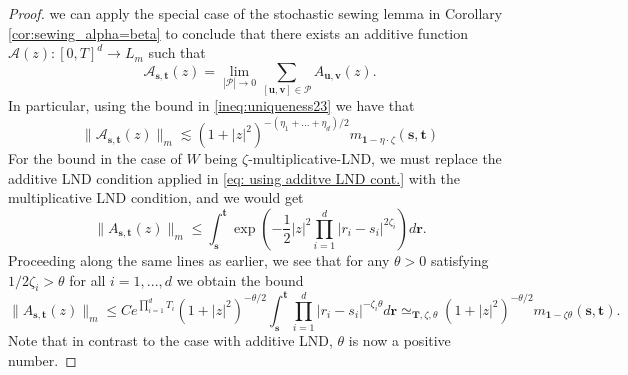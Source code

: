 \documentclass[11pt,oneside,english,reqno]{amsart}
\numberwithin{equation}{section}
\numberwithin{figure}{section}
\theoremstyle{plain}
\theoremstyle{definition}
\theoremstyle{remark}
\theoremstyle{plain}
\theoremstyle{plain}
\theoremstyle{plain}
\theoremstyle{plain}
\theoremstyle{plain}
\newcommand{\cA}{\mathcal{A}}
\newcommand{\cP}{\mathcal{P}}
\newcommand{\br}{\mathbf{r}}
\newcommand{\bu}{\mathbf{u}}
\newcommand{\bv}{\mathbf{v}}
\newcommand{\bs}{\mathbf{s}}
\newcommand{\bt}{\mathbf{t}}
\begin{document}
\begin{proof}
we can apply the special case of the stochastic sewing lemma in Corollary \ref{cor:sewing_alpha=beta} to conclude that there exists an additive function $\cA (z):[0,T]^d\rightarrow L_m$ such that 
\[
\cA_{\bs,\bt}(z)=\lim_{|\cP|\rightarrow 0} \sum_{[\bu,\bv]\in \cP } A_{\bu,\bv}(z). 
\]
%
In particular, using the bound in \eqref{ineq:uniqueness23}  we have that 
\begin{equation*}
    \|\cA_{\bs,\bt}(z)\|_{m}\lesssim (1+|z|^2)^{-(\eta_1+...+\eta_d)/2} m_{\mathbf{1}-\eta\cdot \zeta}(\bs,\bt)
\end{equation*}
%
For the bound in the case of $W$  being $\zeta$-multiplicative-LND, we must replace the additive LND condition applied in \eqref{eq: using additve LND cont.} with the multiplicative LND condition, and we would get 
\begin{equation}\label{eq:usingmultiplicative LND 1}
    \|A_{\bs, \bt}(z)\|_m\leq \int_{\bs}^\bt \exp\left(-\frac{1}{2}|z|^2\prod_{i=1}^d|r_i-s_i|^{2\zeta_i}\right)d\br.
\end{equation} 
Proceeding along the same lines as earlier, we see that for any $\theta>0$ satisfying $1/2\zeta_i>\theta$ for all $i=1,...,d$ we obtain the bound
\[
   \|A_{\bs, \bt}(z)\|_m\leq Ce^{\prod_{i=1}^d T_i} (1+|z|^2)^{-\theta/2}\int_{\bs}^\bt \prod_{i=1}^d |r_i-s_i|^{-\zeta_i\theta} d\br\simeq_{\mathbf{T},\zeta,\theta}  (1+|z|^2)^{-\theta/2}m_{\mathbf{1}-\zeta \theta}(\bs,\bt).  
\]
Note that in contrast to the case with additive LND, $\theta$ is now a positive number.



\end{proof}
\end{document}
